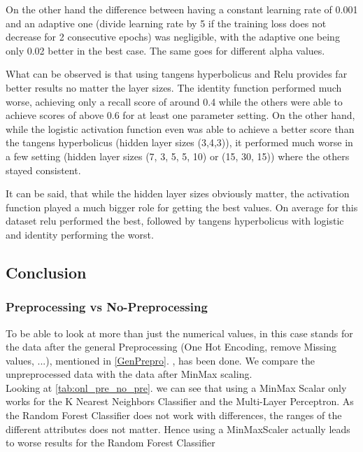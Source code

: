 \documentclass{article}
\newcommand{\secref}[1]{\autoref{#1}. \texit{\nameref{#1}}}
\begin{document}
On the other hand the difference between having a constant learning rate of 0.001 and an adaptive one (divide learning rate by 5 if the training loss does not decrease for 2 consecutive epochs) was negligible, with the adaptive one being only 0.02 better in the best case. The same goes for different alpha values.

What can be observed is that using tangens hyperbolicus and Relu provides far better results no matter the layer sizes. The identity function performed much worse, achieving only a recall score of around 0.4 while the others were able to achieve scores of above 0.6 for at least one parameter setting. On the other hand, while the logistic activation function even was able to achieve a better score than the tangens hyperbolicus (hidden layer sizes (3,4,3)), it performed much worse in a few setting  (hidden layer sizes (7, 3, 5, 5, 10) or (15, 30, 15)) where the others stayed consistent.

It can be said, that while the hidden layer sizes obviously matter, the activation function played a much bigger role for getting the best values. On average for this dataset relu performed the best, followed by tangens hyperbolicus with logistic and identity performing the worst.


\subsection{Conclusion}
\subsubsection{Preprocessing vs No-Preprocessing}
To be able to look at more than just the numerical values,  in this case stands for the data after the general Preprocessing (One Hot Encoding, remove Missing values, ...), mentioned in \secref{GenPrepro}, has been done. We compare the unpreprocessed data with the data after MinMax scaling.\\%
\newline
Looking at \secref{tab:onl_pre_no_pre} we can see that using a MinMax Scalar only works for the K Nearest Neighbors Classifier and the Multi-Layer Perceptron. As the Random Forest Classifier does not work with differences,  the ranges of the different attributes does not matter. Hence using a MinMaxScaler actually leads to worse results for the Random Forest Classifier

\end{document}
